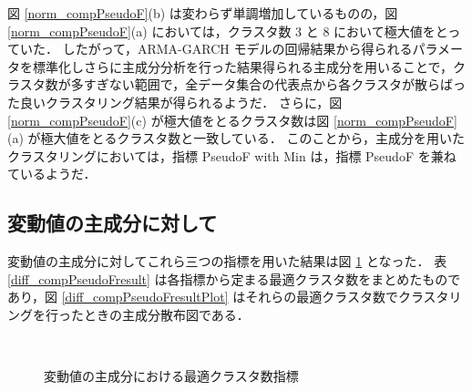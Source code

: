 \documentclass[a4j]{jarticle}
\begin{document}
図 \ref{norm_compPseudoF}(b) は変わらず単調増加しているものの，図  \ref{norm_compPseudoF}(a) においては，クラスタ数 3 と 8 において極大値をとっていた．
したがって，ARMA-GARCH モデルの回帰結果から得られるパラメータを標準化しさらに主成分分析を行った結果得られる主成分を用いることで，クラスタ数が多すぎない範囲で，全データ集合の代表点から各クラスタが散らばった良いクラスタリング結果が得られるようだ．
さらに，図 \ref{norm_compPseudoF}(c) が極大値をとるクラスタ数は図 \ref{norm_compPseudoF}(a) が極大値をとるクラスタ数と一致している．
このことから，主成分を用いたクラスタリングにおいては，指標 PseudoF with Min は，指標 PseudoF を兼ねているようだ．

\newpage
\subsection{変動値の主成分に対して}
変動値の主成分に対してこれら三つの指標を用いた結果は図 \ref{diff_compPseudoF} となった．
表 \ref{diff_compPseudoFresult} は各指標から定まる最適クラスタ数をまとめたものであり，図 \ref{diff_compPseudoFresultPlot} はそれらの最適クラスタ数でクラスタリングを行ったときの主成分散布図である．

\begin{figure}[tb]
\begin{center}
~
~
\caption{変動値の主成分における最適クラスタ数指標}
\label{diff_compPseudoF}
\end{center}
\end{figure}
\end{document}
